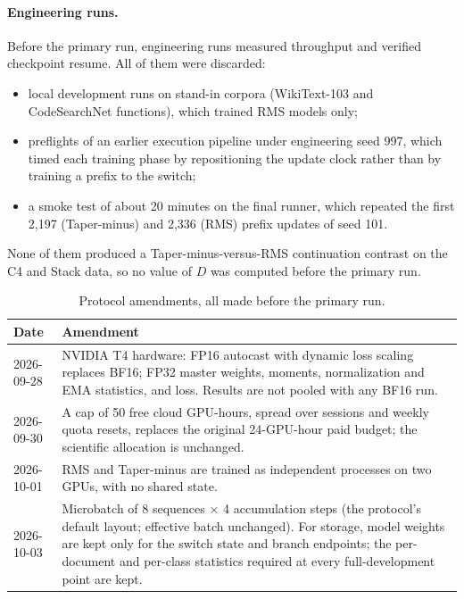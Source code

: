 \documentclass[11pt]{article}
\begin{document}
\paragraph{Engineering runs.} Before the primary run, engineering runs measured throughput and verified
checkpoint resume. All of them were discarded:
\begin{itemize}[leftmargin=1.4em,itemsep=1pt]
  \item local development runs on stand-in corpora (WikiText-103 and CodeSearchNet functions), which trained RMS
        models only;
  \item preflights of an earlier execution pipeline under engineering seed 997, which timed each training phase by
        repositioning the update clock rather than by training a prefix to the switch;
  \item a smoke test of about 20 minutes on the final runner, which repeated the first 2{,}197 (Taper-minus) and
        2{,}336 (RMS) prefix updates of seed 101.
\end{itemize}
None of them produced a Taper-minus-versus-RMS continuation contrast on the C4 and Stack data, so no value of
$D$ was computed before the primary run.

\begin{table}[t]
\centering
\small
\caption{Protocol amendments, all made before the primary run.}
\label{tab:amendments}
\begin{tabular}{@{}lp{12.2cm}@{}}
\toprule
Date & Amendment \\
\midrule
2026-09-28 & NVIDIA T4 hardware: FP16 autocast with dynamic loss scaling replaces BF16; FP32 master weights, moments, normalization and EMA statistics, and loss. Results are not pooled with any BF16 run. \\
2026-09-30 & A cap of 50 free cloud GPU-hours, spread over sessions and weekly quota resets, replaces the original 24-GPU-hour paid budget; the scientific allocation is unchanged. \\
2026-10-01 & RMS and Taper-minus are trained as independent processes on two GPUs, with no shared state. \\
2026-10-03 & Microbatch of 8 sequences $\times$ 4 accumulation steps (the protocol's default layout; effective batch unchanged). For storage, model weights are kept only for the switch state and branch endpoints; the per-document and per-class statistics required at every full-development point are kept. \\
\bottomrule
\end{tabular}
\end{table}
\end{document}
